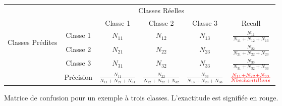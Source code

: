 \begin{figure*}
\begin{center}
\renewcommand{\arraystretch}{3}
\begin{tabular}{|c|c|c|c|c|c|}
\hline
 \multicolumn{2}{|c|}{\multirow{2}{*}{}} & \multicolumn{3}{|c}{Classes Réelles} &  \\
 \cline{3-6}
  \multicolumn{2}{|c|}{} & Classe 1 & Classe 2 & Classe 3 & Recall\\
  \hline
 \multirow{3}{*}{\begin{turn}{90} Classes Prédites\end{turn}} & Classe 1 & $N_{11}$ & $N_{12}$ & $N_{13}$ & $\frac{N_{11}}{N_{11} + N_{12} + N_{13} }$\\
 \cline{2-6}
  & Classe 2 & $N_{21}$ & $N_{22}$ & $N_{23}$ & $\frac{N_{22}}{N_{21} + N_{22} + N_{23} }$\\
  \cline{2-6}
  & Classe 3 & $N_{31}$ & $N_{32}$ & $N_{33}$ & $\frac{N_{33}}{N_{31} + N_{32} + N_{33} }$\\
  \cline{2-6}
  & Précision  & $\frac{N_{11}}{N_{11} + N_{21} + N_{31} }$ & $\frac{N_{22}}{N_{12} + N_{22} + N_{32} }$ & $\frac{N_{33}}{N_{13} + N_{23} + N_{33} }$ & $\textcolor{red}{\frac{N_{11} + N_{22} + N_{33}}{Nb echantillons}}$ \\
\hline

\end{tabular}
\end{center}
\label{ConfMat}
\caption{Matrice de confusion pour un exemple à trois classes. L'exactitude est signifiée en rouge.}
\end{figure*}
